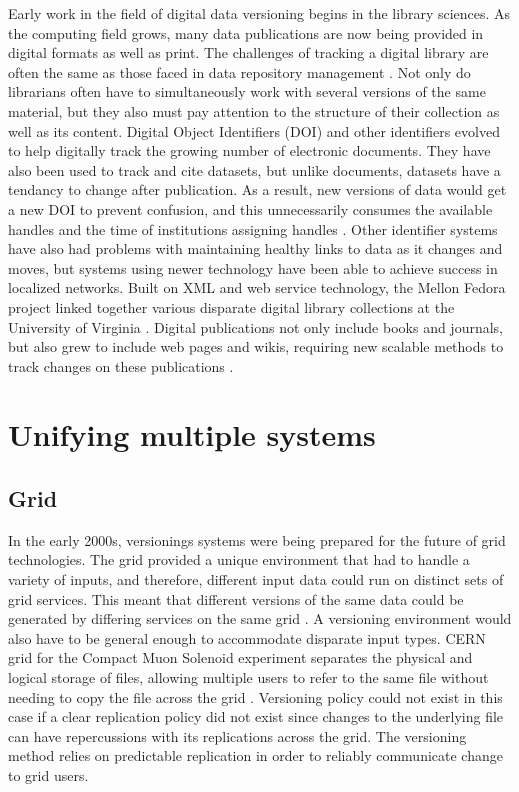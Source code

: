 Early work in the field of digital data versioning begins in the library sciences.
As the computing field grows, many data publications are now being provided in digital formats as well as print.
The challenges of tracking a digital library are often the same as those faced in data repository management \cite{Wiil:2000:RDH:338407.338517}.
Not only do librarians often have to simultaneously work with several versions of the same material, but they also must pay attention to the structure of their collection as well as its content.
Digital Object Identifiers (DOI) and other identifiers evolved to help digitally track the growing number of electronic documents.
They have also been used to track and cite datasets, but unlike documents, datasets have a tendancy to change after publication.
As a result, new versions of data would get a new DOI to prevent confusion, and this unnecessarily consumes the available handles and the time of institutions assigning handles \cite{Lyons2005}.
Other identifier systems have also had problems with maintaining healthy links to data as it changes and moves, but systems using newer technology have been able to achieve success in localized networks.
Built on XML and web service technology, the Mellon Fedora project linked together various disparate digital library collections at the University of Virginia  \cite{Payette2002}.
Digital publications not only include books and journals, but also grew to include web pages and wikis, requiring new scalable methods to track changes on these publications \cite{Berberich:2007:TMT:1277741.1277831}.

\section{Unifying multiple systems}
\subsection{Grid}
In the early 2000s, versionings systems were being prepared for the future of grid technologies.
The grid provided a unique environment that had to handle a variety of inputs, and therefore, different input data could run on distinct sets of grid services.
This meant that different versions of the same data could be generated by differing services on the same grid \cite{Kovse2003VGridAVS}.
A versioning environment would also have to be general enough to accommodate disparate input types.
CERN grid for the Compact Muon Solenoid experiment separates the physical and logical storage of files, allowing multiple users to refer to the same file without needing to copy the file across the grid \cite{Holtman:687353}.
Versioning policy could not exist in this case if a clear replication policy did not exist since changes to the underlying file can have repercussions with its replications across the grid.
The versioning method relies on predictable replication in order to reliably communicate change to grid users.

